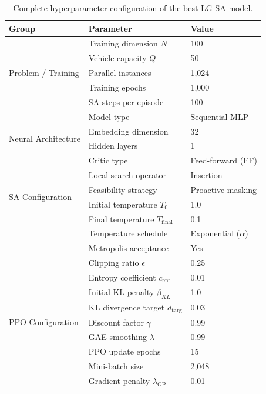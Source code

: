 \documentclass[letterpaper]{article} %
\begin{document}
\begin{table}[t]
\centering
\small
\caption{Complete hyperparameter configuration of the best LG-SA model.}
\label{tab:hyperparameters}
\begin{tabular}{l l l}
\toprule
\textbf{Group} & \textbf{Parameter} & \textbf{Value} \\
\midrule
\multirow{5}{*}{Problem / Training}
  & Training dimension $N$        & 100 \\
  & Vehicle capacity $Q$          & 50 \\
  & Parallel instances            & 1,024 \\
  & Training epochs               & 1,000 \\
  & SA steps per episode          & 100 \\
\midrule
\multirow{4}{*}{Neural Architecture}
  & Model type                    & Sequential MLP \\
  & Embedding dimension           & 32 \\
  & Hidden layers                 & 1 \\
  & Critic type                   & Feed-forward (FF) \\
\midrule
\multirow{4}{*}{SA Configuration}
  & Local search operator         & Insertion \\
  & Feasibility strategy          & Proactive masking \\
  & Initial temperature $T_0$     & 1.0 \\
  & Final temperature $T_\mathrm{final}$ & 0.1 \\
  & Temperature schedule          & Exponential ($\alpha$) \\
  & Metropolis acceptance         & Yes \\
\midrule
\multirow{9}{*}{PPO Configuration}
  & Clipping ratio $\epsilon$     & 0.25 \\
  & Entropy coefficient $c_\text{ent}$ & 0.01 \\
  & Initial KL penalty $\beta_{KL}$ & 1.0 \\
  & KL divergence target $d_\text{targ}$ & 0.03 \\
  & Discount factor $\gamma$      & 0.99 \\
  & GAE smoothing $\lambda$       & 0.99 \\
  & PPO update epochs             & 15 \\
  & Mini-batch size               & 2,048 \\
  & Gradient penalty $\lambda_\text{GP}$ & 0.01 \\

\end{tabular}
\end{table}
\end{document}

